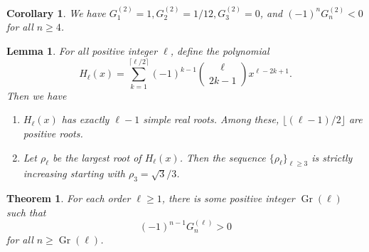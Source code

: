 \documentclass[10pt,a4paper]{amsart}
\newtheorem{cor}{Corollary}
\newtheorem{lem}{Lemma}
\newtheorem{thm}{Theorem}
\DeclareMathOperator{\Gr}{Gr}
\begin{document}
\begin{cor}\label{cor:order2Conj}
We have $G_1^{(2)}=1, G_2^{(2)}=1/12, G_3^{(2)}=0$, and $(-1)^{n} G_n^{(2)}<0$ for all $n\ge 4$.
\end{cor}

\begin{lem}\label{equ:keyLem}
For all positive integer $\ell$, define the polynomial
\begin{equation*}
    H_{\ell}(x)= \sum_{k=1}^{\lceil \ell/2\rceil} (-1)^{k-1} \binom{\ell}{2k-1} x^{\ell-2k+1}.
\end{equation*}
Then we have
\begin{enumerate}
  \item[\upshape{(i)}] $H_{\ell}(x)$ has exactly $\ell-1$ simple real roots. Among these, $\lfloor (\ell-1)/2 \rfloor$ are positive roots.

  \item[\upshape{(ii)}] Let $\rho_\ell$ be the largest root of $H_{\ell}(x)$. Then the sequence $\{\rho_\ell\}_{\ell\ge 3}$ is strictly
  increasing starting with $\rho_3=\sqrt{3}/3$.
\end{enumerate}

\end{lem}

\begin{thm}\label{thm:GregoryGeneralOrder}
For each order $\ell\ge 1$, there is some positive integer $\Gr(\ell)$ such that
\begin{equation*}
(-1)^{n-1} G_n^{(\ell)}>0
\end{equation*}
for all $n\ge \Gr(\ell)$.
\end{thm}
\end{document}

